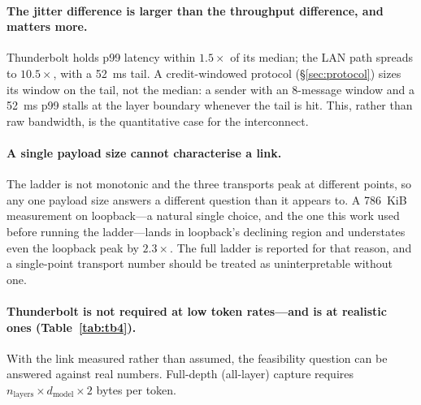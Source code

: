 \documentclass[11pt]{article}
\begin{document}
\paragraph{The jitter difference is larger than the throughput difference, and matters
more.} Thunderbolt holds p99 latency within $1.5\times$ of its median; the LAN path
spreads to $10.5\times$, with a 52~ms tail. A credit-windowed protocol
(\S\ref{sec:protocol}) sizes its window on the tail, not the median: a sender with an
8-message window and a 52~ms p99 stalls at the layer boundary whenever the tail is hit.
This, rather than raw bandwidth, is the quantitative case for the interconnect.

\paragraph{A single payload size cannot characterise a link.} The ladder is not
monotonic and the three transports peak at different points, so any one payload size
answers a different question than it appears to. A 786~KiB measurement on loopback---a
natural single choice, and the one this work used before running the ladder---lands in
loopback's declining region and understates even the loopback peak by $2.3\times$. The
full ladder is reported for that reason, and a single-point transport number should be
treated as uninterpretable without one.

\paragraph{Thunderbolt is not required at low token rates---and is at realistic ones
(Table~\ref{tab:tb4}).} With the link measured rather than assumed, the feasibility
question can be answered against real numbers. Full-depth (all-layer) capture requires
$n_{\text{layers}} \times d_{\text{model}} \times 2$ bytes per token.
\end{document}
